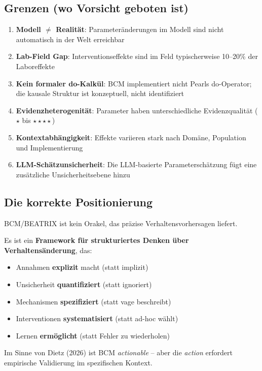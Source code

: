 \documentclass[12pt,a4paper]{article}
\begin{document}
\subsection{Grenzen (wo Vorsicht geboten ist)}

\begin{enumerate}
    \item \textbf{Modell $\neq$ Realität}: Parameteränderungen im Modell sind nicht automatisch in der Welt erreichbar
    \item \textbf{Lab-Field Gap}: Interventionseffekte sind im Feld typischerweise 10--20\% der Laboreffekte
    \item \textbf{Kein formaler do-Kalkül}: BCM implementiert nicht Pearls do-Operator; die kausale Struktur ist konzeptuell, nicht identifiziert
    \item \textbf{Evidenzheterogenität}: Parameter haben unterschiedliche Evidenzqualität ($\star$ bis $\star\star\star\star$)
    \item \textbf{Kontextabhängigkeit}: Effekte variieren stark nach Domäne, Population und Implementierung
    \item \textbf{LLM-Schätzunsicherheit}: Die LLM-basierte Parameterschätzung fügt eine zusätzliche Unsicherheitsebene hinzu
\end{enumerate}

\subsection{Die korrekte Positionierung}

\begin{tcolorbox}[colback=green!5!white, colframe=green!75!black, title=BCM/BEATRIX als ``Actionable Theory''-Framework]
BCM/BEATRIX ist kein Orakel, das präzise Verhaltensvorhersagen liefert.

Es ist ein \textbf{Framework für strukturiertes Denken über Verhaltensänderung}, das:
\begin{itemize}
    \item Annahmen \textbf{explizit} macht (statt implizit)
    \item Unsicherheit \textbf{quantifiziert} (statt ignoriert)
    \item Mechanismen \textbf{spezifiziert} (statt vage beschreibt)
    \item Interventionen \textbf{systematisiert} (statt ad-hoc wählt)
    \item Lernen \textbf{ermöglicht} (statt Fehler zu wiederholen)
\end{itemize}

Im Sinne von Dietz (2026) ist BCM \textit{actionable} -- aber die \textit{action} erfordert empirische Validierung im spezifischen Kontext.
\end{tcolorbox}
\end{document}
